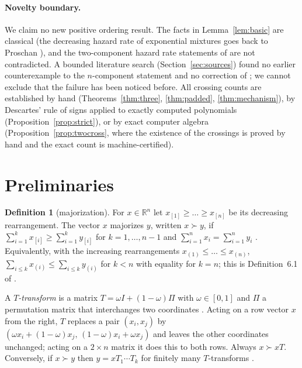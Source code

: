 \documentclass[10pt]{article}
\theoremstyle{plain}
\theoremstyle{definition}
\newtheorem{definition}[theorem]{Definition}
\theoremstyle{remark}
\newcommand{\R}{\mathbb{R}}
\begin{document}
\paragraph{Novelty boundary.} We claim no new positive ordering result. The facts in Lemma~\ref{lem:basic} are classical (the decreasing hazard rate of exponential mixtures goes back to Proschan \cite{Proschan1963}), and the two-component hazard rate statements of \cite{ShojaeeAsadiFinkelstein2022,SahooKayalFinkelstein2026} are not contradicted. A bounded literature search (Section~\ref{sec:sources}) found no earlier counterexample to the $n$-component statement and no correction of \cite{SahooKayalFinkelstein2026}; we cannot exclude that the failure has been noticed before. All crossing counts are established by hand (Theorems~\ref{thm:three}, \ref{thm:padded}, \ref{thm:mechanism}), by Descartes' rule of signs applied to exactly computed polynomials (Proposition~\ref{prop:strict}), or by exact computer algebra (Proposition~\ref{prop:twocross}, where the existence of the crossings is proved by hand and the exact count is machine-certified).

\section{Preliminaries}\label{sec:prelim}

\begin{definition}[majorization]\label{def:maj}
For $x\in\R^n$ let $x_{[1]}\ge\dots\ge x_{[n]}$ be its decreasing rearrangement. The vector $x$ majorizes $y$, written $x\succ y$, if $\sum_{i=1}^k x_{[i]}\ge\sum_{i=1}^k y_{[i]}$ for $k=1,\dots,n-1$ and $\sum_{i=1}^n x_i=\sum_{i=1}^n y_i$ \cite[Chapter~1]{MarshallOlkinArnold2011}. Equivalently, with the increasing rearrangements $x_{(1)}\le\dots\le x_{(n)}$, $\sum_{i\le k}x_{(i)}\le\sum_{i\le k}y_{(i)}$ for $k<n$ with equality for $k=n$; this is Definition~6.1 of \cite{ShojaeeAsadiFinkelstein2022}.
\end{definition}

A \emph{$T$-transform} is a matrix $T=\omega I+(1-\omega)\Pi$ with $\omega\in[0,1]$ and $\Pi$ a permutation matrix that interchanges two coordinates \cite[Chapter~2.B]{MarshallOlkinArnold2011}. Acting on a row vector $x$ from the right, $T$ replaces a pair $(x_i,x_j)$ by $(\omega x_i+(1-\omega)x_j,\,(1-\omega)x_i+\omega x_j)$ and leaves the other coordinates unchanged; acting on a $2\times n$ matrix it does this to both rows. Always $x\succ xT$. Conversely, if $x\succ y$ then $y=xT_1\cdots T_k$ for finitely many $T$-transforms \cite[Lemma~2.B.1]{MarshallOlkinArnold2011}.
\end{document}
